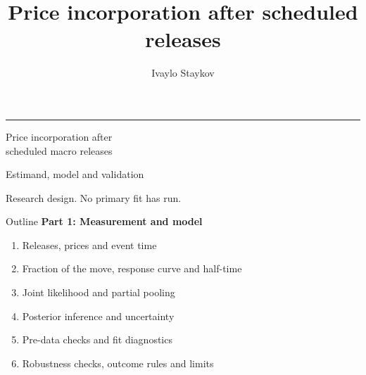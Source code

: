 \documentclass[aspectratio=169,11pt]{beamer}
\title{Price incorporation after scheduled releases}
\author{Ivaylo Staykov}
\newcommand{\heading}[1]{{\bfseries #1}\par\vspace{0.4em}}
\begin{document}
{
\begin{frame}[plain]
\vspace{1.1cm}
{\color{accent}\rule{1.4cm}{2pt}}\par\vspace{0.6cm}
{\huge Price incorporation after\\[0.2em]scheduled macro releases}\par
\vspace{0.8cm}{\large A measurement study of BTCUSDT}\par\vspace{0.4cm}
Estimand, model and validation\par\vspace{0.8cm}
{\small Research design. No primary fit has run.}
\end{frame}}

\begin{frame}{Outline}
\heading{Part 1: Measurement and model}
\begin{enumerate}
\item Releases, prices and event time
\item Fraction of the move, response curve and half-time
\item Joint likelihood and partial pooling
\item Posterior inference and uncertainty
\end{enumerate}
\vspace{0.6cm}\heading{Part 2: Validation and interpretation}
\begin{enumerate}\setcounter{enumi}{4}
\item Pre-data checks and fit diagnostics
\item Robustness checks, outcome rules and limits
\end{enumerate}
\end{frame}
\end{document}

